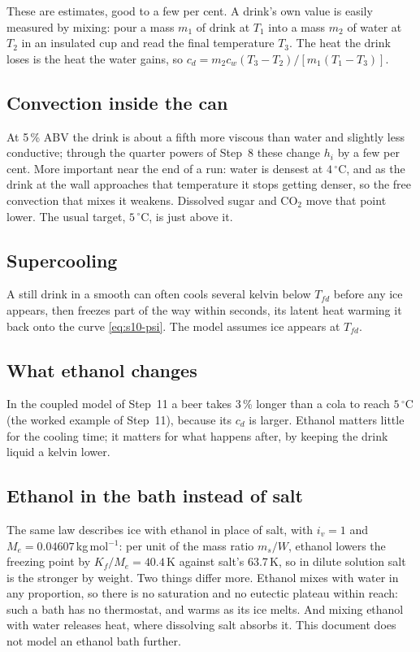 \documentclass[11pt,a4paper]{article}
\newcommand{\dC}{\,{}^{\circ}\mathrm{C}}
\newcommand{\Tfd}{T_{fd}}
\begin{document}
These are estimates, good to a few per cent. A drink's own value is easily measured by mixing: pour a mass
$m_1$ of drink at $T_1$ into a mass $m_2$ of water at $T_2$ in an insulated cup and read the final
temperature $T_3$. The heat the drink loses is the heat the water gains, so
$c_d = m_2c_w(T_3 - T_2)/[m_1(T_1 - T_3)]$.

\subsection{Convection inside the can}
At 5\,\% ABV the drink is about a fifth more viscous than water and slightly less conductive; through the
quarter powers of Step~8 these change $h_i$ by a few per cent. More important near the end of a run: water is
densest at $4\dC$, and as the drink at the wall approaches that temperature it stops getting denser, so the
free convection that mixes it weakens. Dissolved sugar and CO$_2$ move that point lower. The usual target,
$5\dC$, is just above it.

\subsection{Supercooling}
A still drink in a smooth can often cools several kelvin below $\Tfd$ before any ice appears, then freezes
part of the way within seconds, its latent heat warming it back onto the curve \eqref{eq:s10-psi}. The model
assumes ice appears at $\Tfd$.

\subsection{What ethanol changes}
In the coupled model of Step~11 a beer takes 3\,\% longer than a cola to reach $5\dC$
(the worked example of Step~11), because its $c_d$ is larger. Ethanol matters little for the cooling time; it matters
for what happens after, by keeping the drink liquid a kelvin lower.

\subsection{Ethanol in the bath instead of salt}
The same law describes ice with ethanol in place of salt, with $i_v = 1$ and $M_e = 0.04607$\,kg\,mol$^{-1}$:
per unit of the mass ratio $m_s/W$, ethanol lowers the freezing point by $K_f/M_e = 40.4$\,K against salt's
63.7\,K, so in dilute solution salt is the stronger by weight. Two things differ more. Ethanol mixes with
water in any proportion, so there is no saturation and no eutectic plateau within reach: such a bath has no
thermostat, and warms as its ice melts. And mixing ethanol with water releases heat, where dissolving salt
absorbs it. This document does not model an ethanol bath further.
\end{document}

